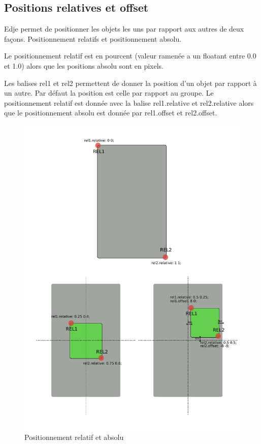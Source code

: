 \documentclass[a4paper]{efr}
\begin{document}
\subsection{Positions relatives et offset}

Edje permet de positionner les objets les uns par rapport aux autres de deux
façons. Positionnement relatifs et positionnement absolu.

Le positionnement relatif est en pourcent (valeur ramenée a un floatant entre
0.0 et 1.0) alors que les positions absolu sont en pixels.

Les balises rel1 et rel2 permettent de donner la position d'un objet par rapport
à un autre. Par défaut la position est celle par rapport au groupe.
Le positionnement relatif est donnée avec la balise rel1.relative et
rel2.relative alors que le positionnement absolu est donnée par rel1.offset et
rel2.offset.

\begin{figure}
  \begin{center}
    \includegraphics[scale=0.7]{images/rel1rel2.pdf}
  \end{center}
  \caption{Positionnement relatif et absolu}
\end{figure}
\end{document}
